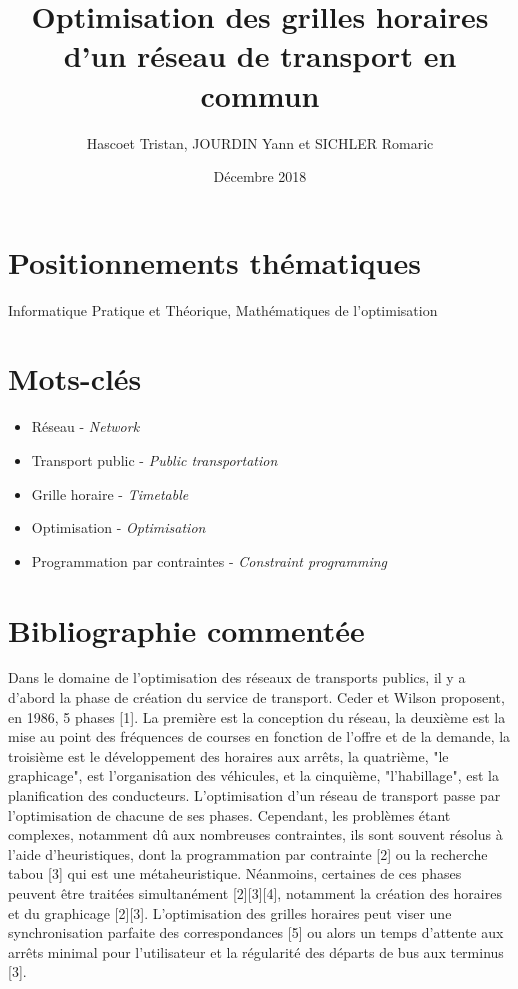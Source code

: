 \documentclass{article}
\title{Optimisation des grilles horaires d'un réseau de transport en commun}
\author{Hascoet Tristan, JOURDIN Yann et SICHLER Romaric }
\date{Décembre 2018}
\begin{document}
\maketitle

\section{Positionnements thématiques}

Informatique Pratique et Théorique, Mathématiques de l'optimisation

\section{Mots-clés}

\begin{itemize}
    \item
    Réseau - \textit{Network}
    \item
    Transport public - \textit{Public transportation}
    \item
    Grille horaire - \textit{Timetable}
    \item 
    Optimisation - \textit{Optimisation}
    \item
    Programmation par contraintes - \textit{Constraint programming}
\end{itemize}

\section{Bibliographie commentée}

Dans le domaine de l'optimisation des réseaux de transports publics, il y a d'abord la phase de création du service de transport. Ceder et Wilson proposent, en 1986, 5 phases [1]. La première est la conception du réseau, la deuxième est la mise au point des fréquences de courses en fonction de l'offre et de la demande, la troisième est le développement des horaires aux arrêts, la quatrième, "le graphicage", est l'organisation des véhicules, et la cinquième, "l'habillage", est la planification des conducteurs.
\newline
L'optimisation d'un réseau de transport passe par l'optimisation de chacune de ses phases. Cependant, les problèmes étant complexes, notamment dû aux nombreuses contraintes, ils sont souvent résolus à l'aide d'heuristiques, dont la programmation par contrainte [2] ou la recherche tabou [3] qui est une métaheuristique. Néanmoins, certaines de ces phases peuvent être traitées simultanément [2][3][4], notamment la création des horaires et du graphicage [2][3].
\newline
L'optimisation des grilles horaires peut viser une synchronisation parfaite des correspondances [5] ou alors un temps d'attente aux arrêts minimal pour l'utilisateur et la régularité des départs de bus aux terminus [3].
\end{document}
